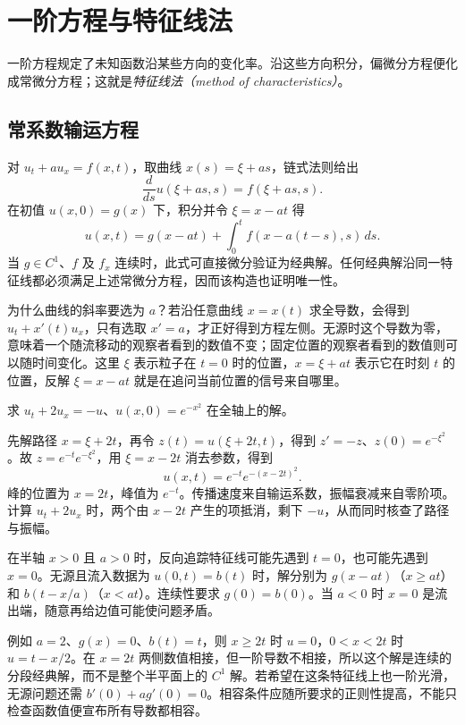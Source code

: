 \setcounter{chapter}{2} %
\chapter{一阶方程与特征线法}
\label{chap:characteristics}

一阶方程规定了未知函数沿某些方向的变化率。沿这些方向积分，偏微分方程便化成常微分方程；这就是\emph{特征线法（method of characteristics）}。

\section{常系数输运方程}
对 $u_t+a u_x=f(x,t)$，取曲线 $x(s)=\xi+as$，链式法则给出
\[
 \frac{d}{ds}u(\xi+as,s)=f(\xi+as,s).
\]
在初值 $u(x,0)=g(x)$ 下，积分并令 $\xi=x-at$ 得
\begin{equation}
 u(x,t)=g(x-at)+\int_0^t f(x-a(t-s),s)\,ds.
 \label{eq:transport-solution}
\end{equation}
当 $g\in C^1$、$f$ 及 $f_x$ 连续时，此式可直接微分验证为经典解。任何经典解沿同一特征线都必须满足上述常微分方程，因而该构造也证明唯一性。

为什么曲线的斜率要选为 $a$？若沿任意曲线 $x=x(t)$ 求全导数，会得到 $u_t+x'(t)u_x$，只有选取 $x'=a$，才正好得到方程左侧。无源时这个导数为零，意味着一个随流移动的观察者看到的数值不变；固定位置的观察者看到的数值则可以随时间变化。这里 $\xi$ 表示粒子在 $t=0$ 时的位置，$x=\xi+at$ 表示它在时刻 $t$ 的位置，反解 $\xi=x-at$ 就是在追问当前位置的信号来自哪里。

\begin{example}[带衰减的平移]
求 $u_t+2u_x=-u$、$u(x,0)=e^{-x^2}$ 在全轴上的解。
\end{example}
\begin{solve}
先解路径 $x=\xi+2t$，再令 $z(t)=u(\xi+2t,t)$，得到 $z'=-z$、$z(0)=e^{-\xi^2}$。故 $z=e^{-t}e^{-\xi^2}$，用 $\xi=x-2t$ 消去参数，得到
\[
 u(x,t)=e^{-t}e^{-(x-2t)^2}.
\]
峰的位置为 $x=2t$，峰值为 $e^{-t}$。传播速度来自输运系数，振幅衰减来自零阶项。计算 $u_t+2u_x$ 时，两个由 $x-2t$ 产生的项抵消，剩下 $-u$，从而同时核查了路径与振幅。
\end{solve}

在半轴 $x>0$ 且 $a>0$ 时，反向追踪特征线可能先遇到 $t=0$，也可能先遇到 $x=0$。无源且流入数据为 $u(0,t)=b(t)$ 时，解分别为 $g(x-at)$（$x\ge at$）和 $b(t-x/a)$（$x<at$）。连续性要求 $g(0)=b(0)$。当 $a<0$ 时 $x=0$ 是流出端，随意再给边值可能使问题矛盾。

例如 $a=2$、$g(x)=0$、$b(t)=t$，则 $x\ge2t$ 时 $u=0$，$0<x<2t$ 时 $u=t-x/2$。在 $x=2t$ 两侧数值相接，但一阶导数不相接，所以这个解是连续的分段经典解，而不是整个半平面上的 $C^1$ 解。若希望在这条特征线上也一阶光滑，无源问题还需 $b'(0)+ag'(0)=0$。相容条件应随所要求的正则性提高，不能只检查函数值便宣布所有导数都相容。


